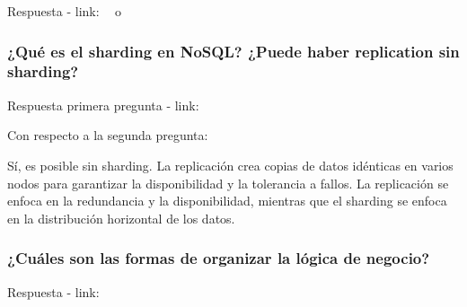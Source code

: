 \documentclass{article}
\begin{document}
  Respuesta - link: \textbf{~} o \textbf{~}


  \subsubsection{¿Qué es el sharding en NoSQL? ¿Puede haber replication sin sharding?}
  Respuesta primera pregunta - link: \textbf{~}
  
  Con respecto a la segunda pregunta: 

  Sí,  es posible sin sharding. La replicación crea copias de datos idénticas en varios nodos para garantizar la disponibilidad y la tolerancia a fallos. La replicación se enfoca en la redundancia y la disponibilidad, mientras que el sharding se enfoca en la distribución horizontal de los datos.



  \subsubsection{¿Cuáles son las formas de organizar la lógica de negocio?}
  Respuesta - link: \textbf{~}
\end{document}
